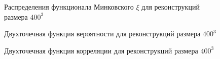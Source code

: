 			\begin{figure}[h]
				\begin{minipage}[h]{0.49\linewidth}
				\end{minipage}
				\hfill
				\begin{minipage}[h]{0.49\linewidth}
				\end{minipage}
				\caption{Распределения функционала Минковского $\xi$ для реконструкций размера $400^3$}
				\label{5-dist-Xi-400}
			\end{figure}
		
			\begin{figure}[h]
				\begin{minipage}[h]{0.49\linewidth}
				\end{minipage}
				\hfill
				\begin{minipage}[h]{0.49\linewidth}
				\end{minipage}
				\caption{Двухточечная функция вероятности для реконструкций размера $400^3$}
				\label{5-prob-400}
			\end{figure}
			
		\begin{figure}[h]
			\begin{minipage}[h]{0.49\linewidth}
			\end{minipage}
			\hfill
			\begin{minipage}[h]{0.49\linewidth}
			\end{minipage}
			\caption{Двухточечная функция корреляции для реконструкций размера $400^3$}
			\label{5-corr-400}
		\end{figure}